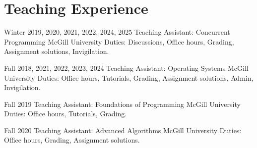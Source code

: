 
\section{Teaching Experience}


    \cventry
        {Winter 2019, 2020, 2021, 2022, 2024, 2025}
        {Teaching Assistant: Concurrent Programming}
        {McGill University}
        {}
        {}
        {Duties: Discussions, Office hours, Grading, Assignment solutions, Invigilation.}

    \cventry
        {Fall 2018, 2021, 2022, 2023, 2024}
        {Teaching Assistant: Operating Systems}
        {McGill University}
        {}
        {}
        {Duties: Office hours, Tutorials, Grading, Assignment solutions, Admin, Invigilation.}

    \cventry
        {Fall 2019}
        {Teaching Assistant: Foundations of Programming}
        {McGill University}
        {}
        {}
        {Duties: Office hours, Tutorials, Grading.}

    \cventry
        {Fall 2020}
        {Teaching Assistant: Advanced Algorithms}
        {McGill University}
        {}
        {}
        {Duties: Office hours, Grading, Assignment solutions.}